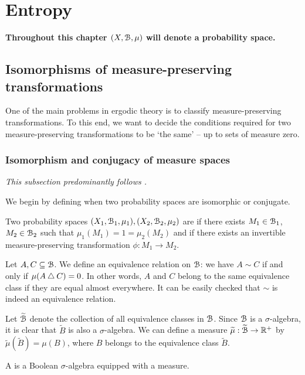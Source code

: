 \chapter{Entropy}
\begin{mdframed}[linewidth=2,leftmargin=108,rightmargin=108,skipbelow=30]
	\textbf{Throughout this chapter $(X, \mathcal{B}, \mu)$ will denote a probability space.}
\end{mdframed}

\section{Isomorphisms of measure-preserving transformations}
One of the main problems in ergodic theory is to classify measure-preserving transformations. To this end, we want to decide the conditions required for two measure-preserving transformations to be `the same' -- up to sets of measure zero.

\subsection{Isomorphism and conjugacy of measure spaces}
\emph{This subsection predominantly follows \cite[Chapter 2]{walters:intro-to-ergodic-theory}.}

We begin by defining when two probability spaces are isomorphic or conjugate.

\begin{definition}
	Two probability spaces $(X_1, \mathcal{B}_1, \mu_1), (X_2, \mathcal{B}_2, \mu_2)$ are  if there exists $M_1 \in \mathcal{B}_1$, $M_2 \in \mathcal{B}_2$ such that $\mu_1(M_1) = 1 = \mu_2(M_2)$ and if there exists an invertible measure-preserving transformation $\phi: M_1 \to M_2$.
\end{definition}

Let $A, C \subseteq \mathcal{B}$. We define an equivalence relation on $\mathcal{B}$: we have $A \sim C$ if and only if $\mu(A \bigtriangleup C) = 0$. In other words, $A$ and $C$ belong to the same equivalence class if they are equal almost everywhere. It can be easily checked that $\sim$ is indeed an equivalence relation.

Let $\widetilde{\mathcal{B}}$ denote the collection of all equivalence classes in $\mathcal{B}$. Since $\mathcal{B}$ is a $\sigma$-algebra, it is clear that $\tilde{B}$ is also a $\sigma$-algebra. We can define a measure $\widetilde{\mu} : \widetilde{\mathcal{B}} \to \mathbb{R}^+$ by $\tilde{\mu}(\tilde{B}) = \mu(B)$, where $B$ belongs to the equivalence class $\tilde{B}$.

\begin{definition}
	A  is a Boolean $\sigma$-algebra equipped with a measure.
\end{definition}

